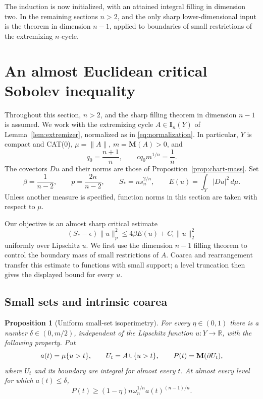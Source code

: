\documentclass[11pt]{article}
\numberwithin{equation}{section}
\newtheorem{proposition}[theorem]{Proposition}
\theoremstyle{definition}
\theoremstyle{remark}
\begin{document}
The induction is now initialized, with an attained integral filling in
dimension two. In the remaining sections $n>2$, and the only sharp
lower-dimensional input is the theorem in dimension $n-1$, applied to
boundaries of small restrictions of the extremizing $n$-cycle.

\section{An almost Euclidean critical Sobolev inequality}
\label{sec:sobolev}

Throughout this section, $n>2$, and the sharp filling theorem in dimension
$n-1$ is assumed.  We work with the extremizing cycle $A\in\mathbf I_n(Y)$ of
Lemma~\ref{lem:extremizer}, normalized as in
\eqref{eq:normalization}.  In particular, $Y$ is compact and CAT(0),
$\mu=\|A\|$, $m=\mathbf M(A)>0$, and
\[
 q_0=\frac{n+1}{n},\qquad cq_0m^{1/n}=\frac1n.
\]
The covectors $Du$ and their norms are those of
Proposition~\ref{prop:chart-mass}.  Set
\begin{equation}
 \beta=\frac1{n-2},\qquad p=\frac{2n}{n-2},\qquad
 S_*=ns_n^{2/n},\qquad
 E(u)=\int_Y|Du|^2\,d\mu.
 \label{eq:sobolev-notation}
\end{equation}
Unless another measure is specified, function norms in this section are
taken with respect to $\mu$.

Our objective is an almost sharp critical estimate
\[
 (S_*-\epsilon)\|u\|_p^2
 \le4\beta E(u)+C_\epsilon\|u\|_2^2
\]
uniformly over Lipschitz $u$. We first use the dimension $n-1$ filling
theorem to control the boundary mass of small restrictions of $A$.
Coarea and rearrangement transfer this estimate to functions with small
support; a level truncation then gives the displayed bound for every $u$.

\subsection{Small sets and intrinsic coarea}

\begin{proposition}[Uniform small-set isoperimetry]
\label{prop:small-set}
For every $\eta\in(0,1)$ there is a number $\delta\in(0,m/2)$, independent
of the Lipschitz function $u\colon Y\to\mathbb R$, with the following property.
Put
\[
 a(t)=\mu\{u>t\},\qquad
 U_t=A\mathbin{\vrule height 1.4ex depth -0.3ex width .07ex\vrule height .07ex depth 0ex width .7ex}\{u>t\},\qquad P(t)=\mathbf M(\partial U_t),
\]
where $U_t$ and its boundary are integral for almost every $t$.
At almost every level for which $a(t)\le\delta$,
\begin{equation}
 P(t)\ge(1-\eta)n\omega_n^{1/n}a(t)^{(n-1)/n}.
 \label{eq:small-set}
\end{equation}
\end{proposition}
\end{document}
